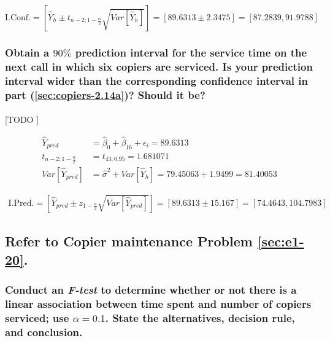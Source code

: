 \documentclass{article}
\begin{document}
        \begin{equation}
          \text{I.Conf.}
          = \left[\widehat{Y}_h \pm t_{n-2;1-\frac{\alpha}{2}}\sqrt{Var\left[\widehat{Y}_h \right]}\right]
          = \left[89.6313 \pm 2.3475\right]
          = \left[87.2839, 91.9788\right]
        \end{equation}

      \subsubsection{Obtain a $90\%$ prediction interval for the service time on the next call in which six copiers are serviced. Is your prediction interval wider than the corresponding confidence interval in part (\ref{sec:copiers-2.14a})? Should it be?}

        \paragraph{}
        [TODO ]

        \begin{align}
          \widehat{Y}_{pred} &= \widehat{\beta}_0 +\widehat{\beta}_16 + \epsilon_i = 89.6313\\
          t_{n-2;1-\frac{\alpha}{2}} &= t_{43;0.95} = 1.681071\\
          Var\left[\widehat{Y}_{pred}\right] &= \widehat{\sigma}^2 + Var\left[\widehat{Y}_h \right]  =79.45063 + 1.9499 = 81.40053
        \end{align}

        \begin{equation}
          \begin{split}
            \text{I.Pred.}
            = \left[\widehat{Y}_{pred} \pm z_{1-\frac{\alpha}{2}}\sqrt{Var\left[\widehat{Y}_{pred}\right]}\right]
            = \left[89.6313 \pm 15.167\right]
            = \left[74.4643, 104.7983\right]
          \end{split}
        \end{equation}


    \setcounter{subsection}{23}
    \subsection{Refer to \textbf{Copier maintenance} Problem \ref{sec:e1-20}.}

      \setcounter{subsubsection}{1}
      \subsubsection{Conduct an \emph{F-test} to determine whether or not there is a linear association between time spent and number of copiers serviced; use $\alpha = 0.1$. State the alternatives, decision rule, and conclusion.}
\end{document}
